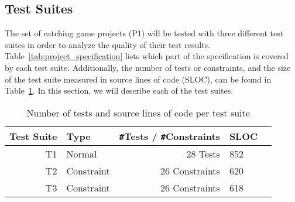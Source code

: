 \subsection{Test Suites}

The set of catching game projects (P1) will be tested with three different test suites
in order to analyze the quality of their test results.
Table~\ref{tab:project_specification} lists which part of the specification is covered by each test suite.
Additionally, the number of tests or constraints, and the size of the test suite measured in source lines of code (SLOC),
can be found in Table~\ref{tab:test_suite_statistics}.
In this section, we will describe each of the test suites.

\begin{table}[htpb]
    \centering
    \scriptsize
    \begin{tabular}{rlrlr}
        \toprule
        Test Suite & Type       & \texttt{\#}Tests / \texttt{\#}Constraints & SLOC \\
        \midrule
        T1         & Normal     & 28 Tests                                  &  852 \\
        T2         & Constraint & 26 Constraints                            &  620 \\
        T3         & Constraint & 26 Constraints                            &  618 \\
        \bottomrule
    \end{tabular}
    \caption{Number of tests and source lines of code per test suite}
    \label{tab:test_suite_statistics}
\end{table}

